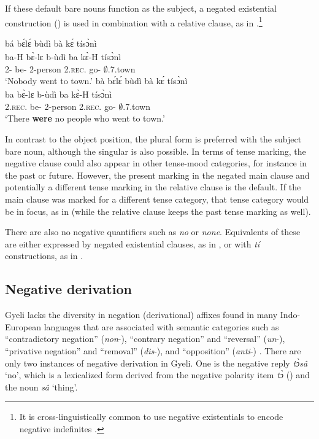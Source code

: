 \documentclass[output=paper,colorlinks=true, citecolor=brown,draftmode]{langscibook}
\begin{document}
If these default bare nouns function as the subject, a negated existential construction () is used in combination with a relative clause, as in .\footnote{It is cross-linguistically common to use negative existentials to encode negative indefinites \citep{Haspelmath1997,Veselinova2013neg.exist}.}

\ea\label{SBJ}
\ea\label{SBJa}
  \glll bá bɛ́lɛ́ bùdì {\ob}bà kɛ́ tísɔ̀nì{\cb}\textsubscript{{\REL}}\\
  ba-H bɛ̀-lɛ b-ùdì {\db}ba kɛ̀-H tísɔ̀nì\\
  2-{\PRS} be-{\NEG} 2-person {\db}2.{\textsc{rec.}\PST} go-{\R} $\emptyset$.7.town\\
      \trans `Nobody went to town.'
\ex\label{SBJb}
 \glll bà bɛ́lɛ́ bùdì {\ob}bà kɛ́ tísɔ̀nì{\cb}\textsubscript{{\REL}}\\
  ba bɛ̀-lɛ b-ùdì {\db}ba kɛ̀-H tísɔ̀nì\\
  2.{\textsc{rec.}\PST} be-{\NEG} 2-person {\db}2.{\textsc{rec.}\PST} go-{\R} $\emptyset$.7.town\\
      \trans `There \textbf{were} no people who went to town.'
\z
\z

In contrast to the object position, the plural form is preferred with the subject bare noun, although the singular is also possible. In terms of tense marking, the negative clause could also appear in other tense-mood categories, for instance in the past or future. However, the present marking in the negated main clause and potentially a different tense marking in the relative clause is the default. If the main clause was marked for a different tense category, that tense category would be in focus, as in  (while the relative clause keeps the past tense marking as well). 

There are also no negative quantifiers such as {\itshape no} or {\itshape none}.  Equivalents of these are either expressed by negated existential clauses, as in , or with {\itshape tí} constructions, as in .  

\subsection{Negative derivation}
\label{sec:gye:Deriv}

Gyeli lacks the diversity in negation (derivational) affixes found in many Indo-European languages that are associated with semantic categories such as ``contradictory negation'' ({\itshape non}-), ``contrary negation'' and ``reversal'' ({\itshape un}-), ``privative negation'' and ``removal'' ({\itshape dis}-), and ``opposition'' ({\itshape anti}-) \citep{CartoniLefer2011,Joshi2020}. 
There are only two instances of negative derivation in Gyeli. One is the negative reply {\itshape tɔ̀sâ} `no', which is a lexicalized form derived from the negative polarity item {\itshape tɔ̀} () and the noun {\itshape sâ} `thing'.
\end{document}
